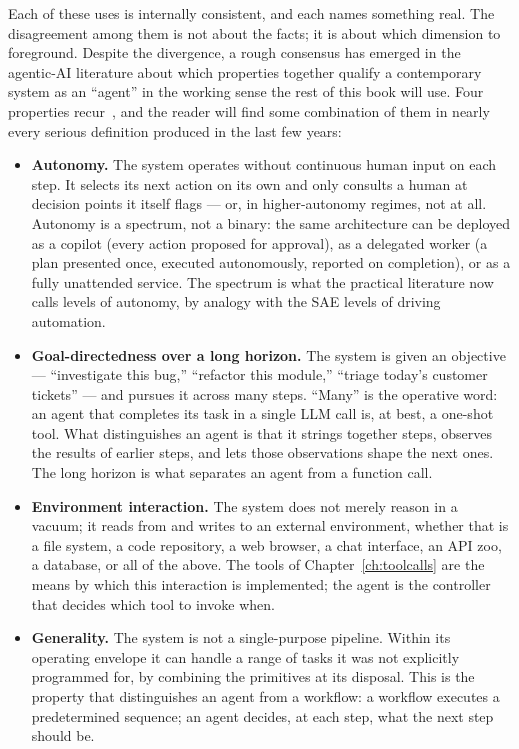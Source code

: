 \medskip
\noindent
Each of these uses is internally consistent, and each names
something real. The disagreement among them is not about the
facts; it is about which dimension to foreground. Despite the
divergence, a rough consensus has emerged in the agentic-AI
literature about which properties together qualify a contemporary
system as an ``agent'' in the working sense the rest of this book
will use. Four properties recur~\citep{staufer2026aiagentindex},
and the reader will find some combination of them in nearly every
serious definition produced in the last few years:

\begin{itemize}[leftmargin=1.5em,itemsep=0.3em]

\item \textbf{Autonomy.} The system operates without
  continuous human input on each step. It selects its next action
  on its own and only consults a human at decision points it
  itself flags --- or, in higher-autonomy regimes, not at all.
  Autonomy is a spectrum, not a binary: the same architecture can
  be deployed as a copilot (every action proposed for approval),
  as a delegated worker (a plan presented once, executed
  autonomously, reported on completion), or as a fully unattended
  service. The spectrum is what the practical literature now
  calls levels of autonomy, by analogy with the SAE levels of
  driving automation.

\item \textbf{Goal-directedness over a long horizon.} The system
  is given an objective --- ``investigate this bug,''
  ``refactor this module,'' ``triage today's customer
  tickets'' --- and pursues it across many steps. ``Many'' is
  the operative word: an agent that completes its task in a
  single LLM call is, at best, a one-shot tool. What
  distinguishes an agent is that it strings together steps,
  observes the results of earlier steps, and lets those
  observations shape the next ones. The long horizon is what
  separates an agent from a function call.

\item \textbf{Environment interaction.} The system does not
  merely reason in a vacuum; it reads from and writes to an
  external environment, whether that is a file system, a code
  repository, a web browser, a chat interface, an API zoo, a
  database, or all of the above. The tools of
  Chapter~\ref{ch:toolcalls} are the means by which this
  interaction is implemented; the agent is the controller that
  decides which tool to invoke when.

\item \textbf{Generality.} The system is not a single-purpose
  pipeline. Within its operating envelope it can handle a range
  of tasks it was not explicitly programmed for, by combining the
  primitives at its disposal. This is the property that
  distinguishes an agent from a workflow: a workflow executes a
  predetermined sequence; an agent decides, at each step, what
  the next step should be.

\end{itemize}

